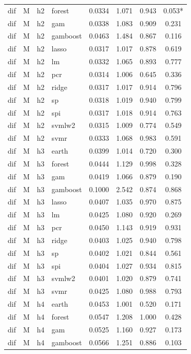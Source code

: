 \begin{ThreePartTable}
\begin{longtable}[t]{llclcccc}
dif & M & h2 & forest & 0.0334 & 1.071 & 0.943 & 0.053*\\
dif & M & h2 & gam & 0.0338 & 1.083 & 0.909 & 0.231\\
dif & M & h2 & gamboost & 0.0463 & 1.484 & 0.867 & 0.116\\
dif & M & h2 & lasso & 0.0317 & 1.017 & 0.878 & 0.619\\
dif & M & h2 & lm & 0.0332 & 1.065 & 0.893 & 0.777\\
dif & M & h2 & pcr & 0.0314 & 1.006 & 0.645 & 0.336\\
dif & M & h2 & ridge & 0.0317 & 1.017 & 0.914 & 0.796\\
dif & M & h2 & sp & 0.0318 & 1.019 & 0.940 & 0.799\\
dif & M & h2 & spi & 0.0317 & 1.018 & 0.914 & 0.763\\
dif & M & h2 & svmlw2 & 0.0315 & 1.009 & 0.774 & 0.549\\
dif & M & h2 & svmr & 0.0333 & 1.068 & 0.983 & 0.591\\
\addlinespace
dif & M & h3 & earth & 0.0399 & 1.014 & 0.720 & 0.300\\
dif & M & h3 & forest & 0.0444 & 1.129 & 0.998 & 0.328\\
dif & M & h3 & gam & 0.0419 & 1.066 & 0.879 & 0.190\\
dif & M & h3 & gamboost & 0.1000 & 2.542 & 0.874 & 0.868\\
dif & M & h3 & lasso & 0.0407 & 1.035 & 0.970 & 0.875\\
dif & M & h3 & lm & 0.0425 & 1.080 & 0.920 & 0.269\\
dif & M & h3 & pcr & 0.0450 & 1.143 & 0.919 & 0.931\\
dif & M & h3 & ridge & 0.0403 & 1.025 & 0.940 & 0.798\\
dif & M & h3 & sp & 0.0402 & 1.021 & 0.844 & 0.561\\
dif & M & h3 & spi & 0.0404 & 1.027 & 0.934 & 0.815\\
dif & M & h3 & svmlw2 & 0.0401 & 1.020 & 0.879 & 0.741\\
dif & M & h3 & svmr & 0.0425 & 1.080 & 0.988 & 0.793\\
\addlinespace
dif & M & h4 & earth & 0.0453 & 1.001 & 0.520 & 0.171\\
dif & M & h4 & forest & 0.0547 & 1.208 & 1.000 & 0.428\\
dif & M & h4 & gam & 0.0525 & 1.160 & 0.927 & 0.173\\
dif & M & h4 & gamboost & 0.0566 & 1.251 & 0.886 & 0.103\\

\end{longtable}
\end{ThreePartTable}
